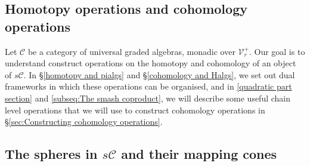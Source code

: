 \documentclass[11pt]{amsart} \renewcommand{\baselinestretch}{1.2}
\theoremstyle{plain}
\theoremstyle{definition}
\newcommand{\calV}{\mathcal{V}}
\newcommand{\calc}{\mathcal{C}}
\newcommand{\vect}[2]{\calV^{#1}_{#2}}
\begin{document}
\begin{Pi-algebras and cohomology algebras}

\section{\textbf{Homotopy operations and cohomology operations}}
\label{Pi-algebras and cohomology algebras}
Let $\calc$ be a category of universal graded algebras, monadic over $\vect{+}{r}$. Our goal is to understand construct operations on the homotopy and cohomology of an object of $s\calc$. In \S\ref{homotopy and pialgs} and \S\ref{cohomology and Halgs}, we set out dual frameworks in which these operations can be organised, and in \ref{quadratic part section} and \ref{subseq:The smash coproduct}, we will describe some useful chain level operations that we will use to construct cohomology operations in \S\ref{sec:Constructing cohomology operations}.

\subsection{The spheres in $s\calc$ and their mapping cones}\label{spheres and cones}




\end{Pi-algebras and cohomology algebras}
\end{document}
